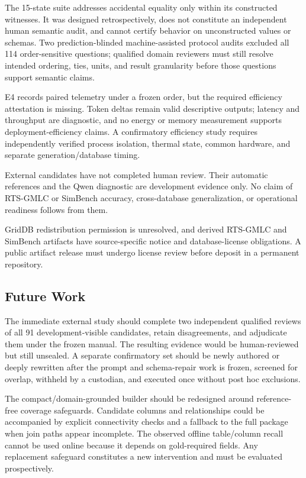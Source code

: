 \documentclass[applsci,article,submit,moreauthors]{Definitions/mdpi}
\begin{document}
The 15-state suite addresses accidental equality only within its constructed witnesses. It was designed retrospectively, does not constitute an independent human semantic audit, and cannot certify behavior on unconstructed values or schemas. Two prediction-blinded machine-assisted protocol audits excluded all 114 order-sensitive questions; qualified domain reviewers must still resolve intended ordering, ties, units, and result granularity before those questions support semantic claims.

E4 records paired telemetry under a frozen order, but the required efficiency attestation is missing. Token deltas remain valid descriptive outputs; latency and throughput are diagnostic, and no energy or memory measurement supports deployment-efficiency claims. A confirmatory efficiency study requires independently verified process isolation, thermal state, common hardware, and separate generation/database timing.

External candidates have not completed human review. Their automatic references and the Qwen diagnostic are development evidence only. No claim of RTS-GMLC or SimBench accuracy, cross-database generalization, or operational readiness follows from them.

GridDB redistribution permission is unresolved, and derived RTS-GMLC and SimBench artifacts have source-specific notice and database-license obligations. A public artifact release must undergo license review before deposit in a permanent repository.

\subsection{Future Work}
The immediate external study should complete two independent qualified reviews of all 91 development-visible candidates, retain disagreements, and adjudicate them under the frozen manual. The resulting evidence would be human-reviewed but still unsealed. A separate confirmatory set should be newly authored or deeply rewritten after the prompt and schema-repair work is frozen, screened for overlap, withheld by a custodian, and executed once without post hoc exclusions.

The compact/domain-grounded builder should be redesigned around reference-free coverage safeguards. Candidate columns and relationships could be accompanied by explicit connectivity checks and a fallback to the full package when join paths appear incomplete. The observed offline table/column recall cannot be used online because it depends on gold-required fields. Any replacement safeguard constitutes a new intervention and must be evaluated prospectively.
\end{document}
